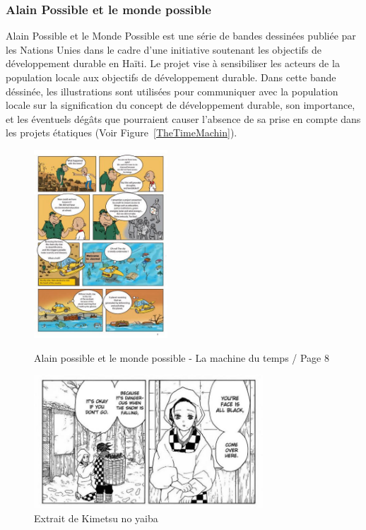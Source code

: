 \subsubsection{Alain Possible et le monde possible \cite{AlainPossible}}
Alain Possible et le Monde Possible est une s\'erie de bandes dessin\'ees publi\'ee par les Nations Unies dans le cadre d'une initiative soutenant les objectifs de d\'eveloppement durable en Ha\"iti. Le projet vise \`a sensibiliser les acteurs de la population locale aux objectifs de d\'eveloppement durable. Dans cette bande d\'essin\'ee, les illustrations sont utilis\'ees pour communiquer avec la population locale sur la signification du concept de d\'eveloppement durable, son importance, et les \'eventuels d\'eg\^ats que pourraient causer l'absence de sa prise en compte dans les projets \'etatiques (Voir Figure~\ref{TheTimeMachin}).




\begin{figure}[ht]
	\vspace{10pt}
	\centering
	\begin{minipage}{0.45\textwidth}
		\centering
		\includegraphics[width=5cm]{Pictures/AlainPossibleTheTimeMachine.jpg}
		\caption{Alain possible et le monde possible - La machine du temps / Page 8\cite{AlainPossible}}
		\label{TheTimeMachin}
	\end{minipage}
	\hspace{10pt}
	\begin{minipage}{0.45\textwidth}
		\centering
		\includegraphics[height=5cm]{Pictures/DeKimetsuNoYaiba.jpg}
		\caption{Extrait de Kimetsu no yaiba}
		\label{DemonSlayer}
	\end{minipage}
\end{figure}

